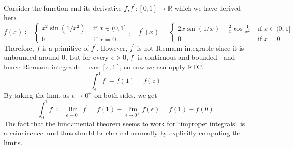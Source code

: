   \begin{example}
    \label{ex:essential-discontinuities}
    Consider the function and its derivative $f, f^\prime : [0, 1] \to \mathbb{R}$ which we have derived \hyperref[ex:wiggly-sine]{here}. 
    \begin{equation}
      f(x) \coloneqq \begin{cases} 
        x^2 \sin (1/x^2) & \text{ if } x \in (0, 1] \\
        0 & \text{ if } x = 0
      \end{cases}, \quad f^\prime (x) \coloneqq \begin{cases} 
        2 x \sin(1/x) - \frac{2}{x} \cos \frac{1}{x^2} & \text{ if } x \in (0, 1] \\ 
        0 & \text{ if } x = 0
      \end{cases}
    \end{equation}
    Therefore, $f$ is a primitive of $f^\prime$. However, $f^\prime$ is not Riemann integrable since it is unbounded around $0$. But for every $\epsilon > 0$, $f^\prime$ is continuous and bounded---and hence Riemann integrable---over $[\epsilon, 1]$, so now we can apply FTC. 
    \begin{equation}
      \int_\epsilon^1 f^\prime = f(1) - f(\epsilon)
    \end{equation}
    By taking the limit as $\epsilon \to 0^+$ on both sides, we get 
    \begin{equation}
      \int_{0}^1 f^\prime \coloneqq \lim_{\epsilon \to 0^+} f^\prime = f(1) - \lim_{\epsilon \to 0^+} f(\epsilon) = f(1) - f(0)
    \end{equation}
    The fact that the fundamental theorem seems to work for ``improper integrals'' is a coincidence, and thus should be checked manually by explicitly computing the limits. 
  \end{example}

